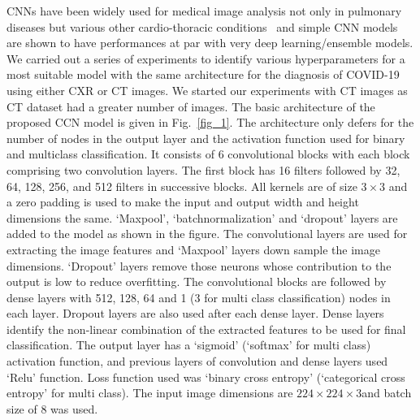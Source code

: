 \documentclass[10pt,journal,compsoc]{IEEEtran}
\begin{document}
CNNs have been widely used for medical image analysis not only in pulmonary diseases but various other cardio-thoracic conditions~\cite{mitra2020systematic} and simple CNN models are shown to have performances at par with very deep learning/ensemble models. We carried out a series of experiments to identify various hyperparameters for a most suitable model with the same architecture for the diagnosis of COVID-19 using either CXR or CT images. We started our experiments with CT images as CT dataset had a greater number of images. The basic architecture of the proposed CCN model is given in Fig.~\ref{fig_1}. The architecture only defers for the number of nodes in the output layer and the activation function used for binary and multiclass classification. It consists of 6 convolutional blocks with each block comprising two convolution layers. The first block has 16 filters followed by 32, 64, 128, 256, and 512 filters in successive blocks. All kernels are of size \begin{math} 3 \times 3 \end{math} and a zero padding is used to make the input and output width and height dimensions the same. ‘Maxpool’, ‘batchnormalization’ and ‘dropout’ layers are added to the model as shown in the figure. The convolutional layers are used for extracting the image features and ‘Maxpool’ layers down sample the image dimensions. ‘Dropout’ layers remove those neurons whose contribution to the output is low to reduce overfitting. The convolutional blocks are followed by dense layers with 512, 128, 64 and 1 (3 for multi class classification) nodes in each layer. Dropout layers are also used after each dense layer. Dense layers identify the non-linear combination of the extracted features to be used for final classification. The output layer has a ‘sigmoid’ (‘softmax' for multi class) activation function, and previous layers of convolution and dense layers used ‘Relu’ function. Loss function used was ‘binary cross entropy’ (‘categorical cross entropy’ for multi class). The input image dimensions are \begin{math} 224 \times 224 \times 3 \end{math}and batch size of 8 was used. 
\end{document}
